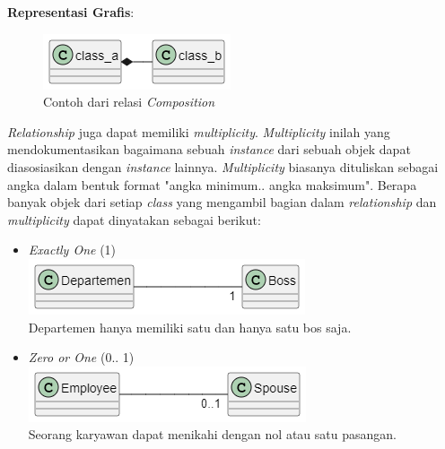 \documentclass[a4paper]{article}
\begin{document}
\begin{enumerate}
\begin{itemize}
        \textbf{Representasi Grafis}:\\
        \begin{figure}[h]
            \centering
            \includegraphics[scale=0.5]{class diagram composition example.png}
            \caption{Contoh dari relasi \textit{Composition}}
        \end{figure}
    \end{itemize}
    \textit{Relationship} juga dapat memiliki \textit{multiplicity}. \textit{Multiplicity} inilah yang mendokumentasikan bagaimana sebuah \textit{instance} dari sebuah objek dapat diasosiasikan dengan \textit{instance} lainnya. \textit{Multiplicity} biasanya dituliskan sebagai angka dalam bentuk format "angka minimum.. angka maksimum"\autocite{systemanalysisdesign-class-diagram}. Berapa banyak objek dari setiap \textit{class} yang mengambil bagian dalam \textit{relationship} dan \textit{multiplicity} dapat dinyatakan sebagai berikut:
    \begin{itemize}
        \item \textit{Exactly One} (1)\\
            \includegraphics[scale=0.475]{multiplicity exactly one.png}\\
            Departemen hanya memiliki satu dan hanya satu bos saja.
        \item \textit{Zero or One} (0.. 1)\\
            \includegraphics[scale=0.475]{multiplicity zero to one example.png}\\
            Seorang karyawan dapat menikahi dengan nol atau satu pasangan.

\end{itemize}
\end{enumerate}
\end{document}
